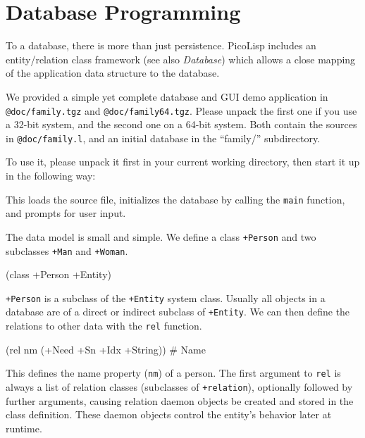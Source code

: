  
\section{Database Programming}
\label{sec:tut-database-programming}


To a database, there is more than just persistence. PicoLisp includes an
entity/relation class framework (see also \emph{Database})
which allows a close mapping of the application data structure to the
database.

We provided a simple yet complete database and GUI demo application in
\texttt{@doc/family.tgz} and \texttt{@doc/family64.tgz}. Please unpack the first one
if you use a 32-bit system, and the second one on a 64-bit system. Both
contain the sources in \texttt{@doc/family.l}, and an initial database in the
``family/'' subdirectory.

To use it, please unpack it first in your current working directory,
then start it up in the following way:



This loads the source file, initializes the database by calling the
\texttt{main} function, and prompts for user input.

The data model is small and simple. We define a class \texttt{+Person} and two
subclasses \texttt{+Man} and \texttt{+Woman}.


\begin{wideverbatim}
(class +Person +Entity)
\end{wideverbatim}

\texttt{+Person} is a subclass of the \texttt{+Entity} system class. Usually all
objects in a database are of a direct or indirect subclass of \texttt{+Entity}.
We can then define the relations to other data with the \texttt{rel} function.


\begin{wideverbatim}
(rel nm (+Need +Sn +Idx +String))      # Name
\end{wideverbatim}

This defines the name property (\texttt{nm}) of a person. The first argument to
\texttt{rel} is always a list of relation classes (subclasses of \texttt{+relation}),
optionally followed by further arguments, causing relation daemon
objects be created and stored in the class definition. These daemon
objects control the entity's behavior later at runtime.

